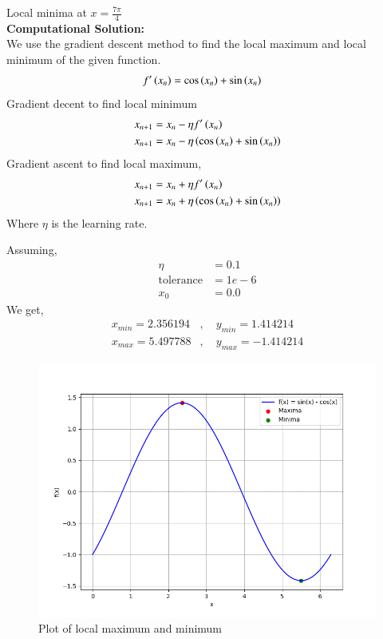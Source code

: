 \documentclass[journal]{IEEEtran}
\begin{document}
 Local minima at $x = \frac{7\pi}{4}$\\
 
\textbf{Computational Solution: }\\
We use the gradient descent method to find the local maximum and local minimum of the given function.
\begin{align}
    f^\prime\left(x_{n}\right) &= \cos{\ensuremath{\left(x_{n}\right)}} + \sin\left({x_n}\right)
\end{align}
Gradient decent to find local minimum
\begin{align}
x_{n+1} &= x_{n} - \eta f^\prime\left(x_{n}\right) \\
    x_{n+1} &= x_{n} - \eta \left(\cos{\ensuremath{\left(x_{n}\right)}} + \sin{\ensuremath{\left(x_n\right)}}\right)
\end{align}
Gradient ascent to find local maximum,
\begin{align}
    x_{n+1} &= x_{n} + \eta f^\prime\left(x_{n}\right) \\
    x_{n+1} &= x_{n} + \eta \left(\cos{\ensuremath{\left(x_{n}\right)}} + \sin{\ensuremath{\left(x_n\right)}}\right)
\end{align}
Where $\eta$ is the learning rate.

Assuming,
\begin{align}
    \eta &= 0.1 \\
    \text{tolerance} &= 1e-6 \\
    x_{0} &= 0.0
\end{align}
We get,
\begin{align}
    x_{min} = 2.356194 &,\quad y_{min} = 1.414214 \\
    x_{max} = 5.497788 &,\quad y_{max} = -1.414214
\end{align}
\newpage

\begin{figure}[ht]
    \centering
    \includegraphics[width=\columnwidth]{figs/fig.png}
    \caption{Plot of local maximum and minimum}
    \label{fig:Plot1}
    \end{figure}
\end{document}
